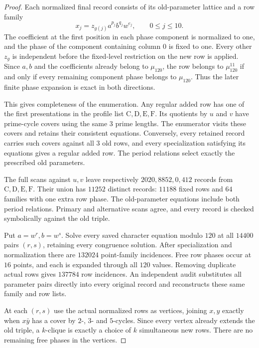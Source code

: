 \documentclass[11pt,a4paper]{article}
\theoremstyle{plain}
\theoremstyle{definition}
\theoremstyle{plain}
\begin{document}
\begin{proof}
Each normalized final record consists of its old-parameter lattice and a row family
\[
x_j=z_{g(j)}a^{p_j}b^{q_j}w^{e_j},
\qquad 0\leq j\leq10.
\]
The coefficient at the first position in each phase component is normalized to one, and the phase of the component containing column $0$ is fixed to one. Every other $z_g$ is independent before the fixed-level restriction on the new row is applied. Since $a,b$ and the coefficients already belong to $\mu_{120}$, the row belongs to $\mu_{120}^{11}$ if and only if every remaining component phase belongs to $\mu_{120}$. Thus the later finite phase expansion is exact in both directions.

This gives completeness of the enumeration. Any regular added row has one of the first presentations in the profile list $\mathrm{C},\mathrm{D},\mathrm{E},\mathrm{F}$. Its quotients by $u$ and $v$ have prime-cycle covers using the same 3 prime lengths. The enumerator visits these covers and retains their consistent equations. Conversely, every retained record carries such covers against all 3 old rows, and every specialization satisfying its equations gives a regular added row. The period relations select exactly the prescribed old parameters.

\medskip

The full scans against $u,v$ leave respectively $2020,8852,0,412$ records from $\mathrm{C},\mathrm{D},\mathrm{E},\mathrm{F}$. Their union has $11252$ distinct records: $11188$ fixed rows and $64$ families with one extra row phase. The old-parameter equations include both period relations. Primary and alternative scans agree, and every record is checked symbolically against the old triple.

\medskip

Put $a=w^{r},b=w^{s}$. Solve every saved character equation modulo $120$ at all $14400$ pairs $(r,s)$, retaining every congruence solution. After specialization and normalization there are $132024$ point-family incidences. Free row phases occur at $16$ points, and each is expanded through all $120$ values. Removing duplicate actual rows gives $137784$ row incidences. An independent audit substitutes all parameter pairs directly into every original record and reconstructs these same family and row lists.

\medskip

At each $(r,s)$ use the actual normalized rows as vertices, joining $x,y$ exactly when $x\bar y$ has a cover by $2$-, $3$- and $5$-cycles. Since every vertex already extends the old triple, a $k$-clique is exactly a choice of $k$ simultaneous new rows. There are no remaining free phases in the vertices.


\end{proof}
\end{document}
